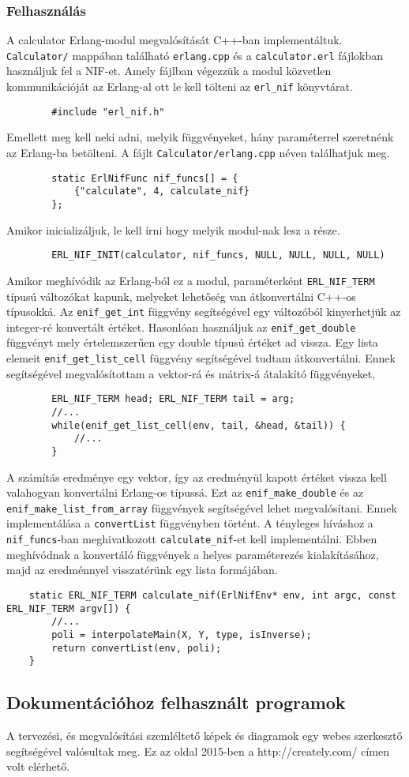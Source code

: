 	\subsubsection{Felhasználás}
	A calculator Erlang-modul megvalósítását C++-ban implementáltuk.\newline
	\texttt{Calculator/} mappában található \texttt{erlang.cpp} és a \texttt{calculator.erl} fájlokban használjuk fel a NIF-et.
	Amely fájlban végezzük a modul közvetlen kommunikációját az Erlang-al ott le kell tölteni az \texttt{erl\_nif} könyvtárat.
	\begin{verbatim}
		#include "erl_nif.h"
	\end{verbatim}
	Emellett meg kell neki adni, melyik függvényeket, hány paraméterrel szeretnénk az Erlang-ba betölteni. 
	A fájlt \texttt{Calculator/erlang.cpp} néven találhatjuk meg.
	\begin{verbatim}
		static ErlNifFunc nif_funcs[] = {
		    {"calculate", 4, calculate_nif}
		};
	\end{verbatim}
	Amikor inicializáljuk, le kell írni hogy melyik modul-nak lesz a része. 
	\begin{verbatim}
		ERL_NIF_INIT(calculator, nif_funcs, NULL, NULL, NULL, NULL)
	\end{verbatim}
	Amikor meghívódik az Erlang-ból ez a modul, paraméterként \texttt{ERL\_NIF\_TERM} típusú változókat kapunk, melyeket lehetőség van átkonvertálni C++-os típusokká. \newline
	Az \texttt{enif\_get\_int} függvény segítségével egy változóból kinyerhetjük az integer-ré konvertált értéket. Hasonlóan használjuk az \texttt{enif\_get\_double} függvényt mely értelemszerűen egy double típusú értéket ad vissza.
	\newline
	Egy lista elemeit \texttt{enif\_get\_list\_cell} függvény segítségével tudtam átkonvertálni. 
	Ennek segítségével megvalósítottam a vektor-rá és mátrix-á átalakító függvényeket,
	\begin{verbatim}
		ERL_NIF_TERM head; ERL_NIF_TERM tail = arg;
		//...
		while(enif_get_list_cell(env, tail, &head, &tail)) {
		    //...
		}
	\end{verbatim}
	A számítás eredménye egy vektor, így az eredményül kapott értéket vissza kell valahogyan konvertálni Erlang-os típussá. Ezt az \texttt{enif\_make\_double} és az \texttt{enif\_make\_list\_from\_array} függvények segítségével lehet megvalósítani. 
	Ennek implementálása a \texttt{convertList} függvényben történt.
	\newline
	A tényleges híváshoz a \texttt{nif\_funcs}-ban meghivatkozott \texttt{calculate\_nif}-et kell implementálni. \newline
	Ebben meghívódnak a konvertáló függvények a helyes paraméterezés kialakításához, majd az eredménnyel visszatérünk egy lista formájában.
	\begin{verbatim}
	static ERL_NIF_TERM calculate_nif(ErlNifEnv* env, int argc, const ERL_NIF_TERM argv[]) {
	    //...
	    poli = interpolateMain(X, Y, type, isInverse);
	    return convertList(env, poli);
	}
	\end{verbatim}

\subsection{Dokumentációhoz felhasznált programok}
	A tervezési, és megvalósítási szemléltető képek és diagramok egy webes szerkesztő segítségével valósultak meg. Ez az oldal 2015-ben a http://creately.com/ címen volt elérhető.